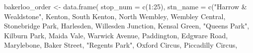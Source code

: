 \documentclass[
  krantz2]{krantz}
\makeatletter
\newenvironment{Shaded}{\begin{snugshade}}{\end{snugshade}}
\newcommand{\AttributeTok}[1]{\textcolor[rgb]{0.61,0.61,0.61}{#1}}
\newcommand{\DecValTok}[1]{\textcolor[rgb]{0.06,0.06,0.06}{#1}}
\newcommand{\FunctionTok}[1]{\textcolor[rgb]{0,0,0}{#1}}
\newcommand{\NormalTok}[1]{#1}
\newcommand{\OtherTok}[1]{\textcolor[rgb]{0.37,0.37,0.37}{#1}}
\newcommand{\SpecialCharTok}[1]{\textcolor[rgb]{0,0,0}{#1}}
\newcommand{\StringTok}[1]{\textcolor[rgb]{0.5,0.5,0.5}{#1}}
\newenvironment{kframe}{%
\medskip{}
\setlength{\fboxsep}{.8em}
 \def\at@end@of@kframe{}%
 \ifinner\ifhmode%
  \def\at@end@of@kframe{\end{minipage}}%
  \begin{minipage}{\columnwidth}%
 \fi\fi%
 \def\FrameCommand##1{\hskip\@totalleftmargin \hskip-\fboxsep
 \colorbox{shadecolor}{##1}\hskip-\fboxsep
     \hskip-\linewidth \hskip-\@totalleftmargin \hskip\columnwidth}%
 \MakeFramed {\advance\hsize-\width
   \@totalleftmargin\z@ \linewidth\hsize
   \@setminipage}}%
 {\par\unskip\endMakeFramed%
 \at@end@of@kframe}
\renewenvironment{Shaded}{\begin{kframe}}{\end{kframe}}
\makeatother
\begin{document}
\begin{Shaded}
\begin{Highlighting}[]
\NormalTok{bakerloo\_order }\OtherTok{\textless{}{-}} \FunctionTok{data.frame}\NormalTok{( }\AttributeTok{stop\_num =} \FunctionTok{c}\NormalTok{(}\DecValTok{1}\SpecialCharTok{:}\DecValTok{25}\NormalTok{),}
                              \AttributeTok{stn\_name =} \FunctionTok{c}\NormalTok{(}\StringTok{"Harrow \& Wealdstone"}\NormalTok{,}
                                           \StringTok{\textquotesingle{}Kenton\textquotesingle{}}\NormalTok{,}
                                           \StringTok{\textquotesingle{}South Kenton\textquotesingle{}}\NormalTok{,}
                                           \StringTok{\textquotesingle{}North Wembley\textquotesingle{}}\NormalTok{,}
                                           \StringTok{\textquotesingle{}Wembley Central\textquotesingle{}}\NormalTok{,}
                                           \StringTok{\textquotesingle{}Stonebridge Park\textquotesingle{}}\NormalTok{,}
                                           \StringTok{\textquotesingle{}Harlesden\textquotesingle{}}\NormalTok{,}
                                           \StringTok{\textquotesingle{}Willesden Junction\textquotesingle{}}\NormalTok{,}
                                           \StringTok{\textquotesingle{}Kensal Green\textquotesingle{}}\NormalTok{,}
                                           \StringTok{"Queen\textquotesingle{}s Park"}\NormalTok{,}
                                           \StringTok{\textquotesingle{}Kilburn Park\textquotesingle{}}\NormalTok{,}
                                           \StringTok{\textquotesingle{}Maida Vale\textquotesingle{}}\NormalTok{,}
                                           \StringTok{\textquotesingle{}Warwick Avenue\textquotesingle{}}\NormalTok{,}
                                           \StringTok{\textquotesingle{}Paddington\textquotesingle{}}\NormalTok{,}
                                           \StringTok{\textquotesingle{}Edgware Road\textquotesingle{}}\NormalTok{,}
                                           \StringTok{\textquotesingle{}Marylebone\textquotesingle{}}\NormalTok{,}
                                           \StringTok{\textquotesingle{}Baker Street\textquotesingle{}}\NormalTok{,}
                                           \StringTok{"Regent\textquotesingle{}s Park"}\NormalTok{,}
                                           \StringTok{\textquotesingle{}Oxford Circus\textquotesingle{}}\NormalTok{,}
                                           \StringTok{\textquotesingle{}Piccadilly Circus\textquotesingle{}}\NormalTok{,}

\end{Highlighting}
\end{Shaded}
\end{document}
